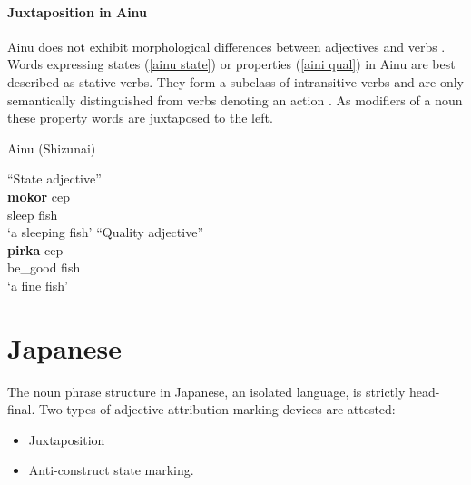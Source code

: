 \paragraph{Juxtaposition in Ainu}
\label{ainu synchr}
Ainu does not exhibit morphological differences between adjectives and verbs \citep[27]{refsing1986}. Words expressing states (\ref{ainu state}) or properties (\ref{aini qual}) in Ainu are best described as stative verbs. They form a subclass of intransitive verbs and are only semantically distinguished from verbs denoting an action \cite[141–142]{refsing1986}. As modifiers of a noun these property words are juxtaposed to the left.
\begin{exe}
\ex \rm{Ainu (Shizunai) \citep[142]{refsing1986}}%
\begin{xlist}
\ex \rm{“State adjective”}\\ \label{ainu state}
\gll	\textbf{mokor} cep\\
	sleep fish\\
\glt	‘a sleeping fish’
\ex \rm{“Quality adjective”}\\ \label{aini qual}
\gll	\textbf{pirka} cep\\
	be\_good fish\\
\glt	‘a fine fish’
\end{xlist}
\end{exe}

\section{Japanese}
The noun phrase structure in Japanese, an isolated language, is strictly head-final. Two types of adjective attribution marking devices are attested:
\begin{itemize}
\item Juxtaposition
\item Anti-construct state marking.
\end{itemize}
